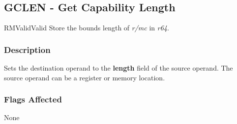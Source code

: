 \clearpage
{}
{}
\subsection*{GCLEN - Get Capability Length}

\begin{x86opcodetable}
  {RM}{Valid}{Valid}
  {Store the bounds length of \emph{r/mc} in \emph{r64}.}
\end{x86opcodetable}

\begin{x86opentable}
\end{x86opentable}

\subsubsection*{Description}

Sets the destination operand to the \textbf{length} field of the
source operand.  The source operand can be a register or memory
location.

\subsubsection*{Flags Affected}

None
